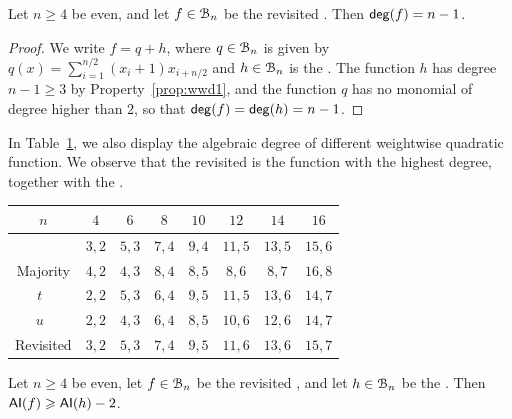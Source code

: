 \documentclass{llncs}
\begin{document}
\begin{proposition}
	Let $n\geq 4$ be even, and let $f\in\mathcal{B}_n$ be the revisited \hwbf{}. Then $\mathsf{deg}(f)=n-1$.
\end{proposition}
\begin{proof}
	We write $f=q+h$, where $q\in\mathcal{B}_n$ is given by $q(x)=\sum_{i=1}^{n/2} (x_i+1) x_{i+n/2}$ and $h\in\mathcal{B}_n$ is the \hwbf{}. The function $h$ has degree $n-1\geq 3$ by Property~\ref{prop:wwd1}, and the function $q$ has no monomial of degree higher than $2$, so that $\mathsf{deg}(f)=\mathsf{deg}(h)=n-1$.
\end{proof}

In Table~\ref{table:comparisonsDegAI}, we also display the algebraic degree of different weightwise quadratic function. We observe that the revisited \hwbf{} is the function with the highest degree, together with the \hwbf{}. 

\begin{table}
	\scriptsize
	\centering
	\begin{tabular}{|c|c|c|c|c|c|c|c|}
		\hline
		$n$ & $4$  & $6$  & $8$  &  $10$ & $12$ & $14$ & $16$  \\
		\hline
		\hwbf{}   & $3, 2$  & $5, 3$  & $7, 4$  &  $9, 4$ & $11, 5$ & $13, 5$ & $15, 6$  \\  	
		Majority   & $4, 2$  & $4, 3$  & $8, 4$  &  $8, 5$ & $8, 6$ & $8, 7$ & $16, 8$  \\
		$t$~\cite{DAM:MeaOza24}   & $2, 2$  & $5, 3$  & $6, 4$  &  $9, 5$ & $11, 5$ & $13, 6$ & $14, 7$\\
		$u$~\cite{DAM:MeaOza24}   & $2, 2$  & $4, 3$  & $6, 4$  &  $8, 5$ & $10, 6$ & $12, 6$ & $14, 7$ \\
		Revisited \hwbf{}  & $3, 2$  & $5, 3$  & $7, 4$  &  $9, 5$ & $11, 6$ & $13, 6$ & $15, 7$\\
		\hline
	\end{tabular}
	\label{table:comparisonsDegAI}
\end{table}

\begin{proposition}
	Let $n\geq 4$ be even, let $f\in\mathcal{B}_n$ be the revisited \hwbf{}, and let $h\in\mathcal{B}_n$ be the \hwbf{}. Then $\mathsf{AI}(f)\geqslant \mathsf{AI}(h)-2$.
\end{proposition}
\end{document}
